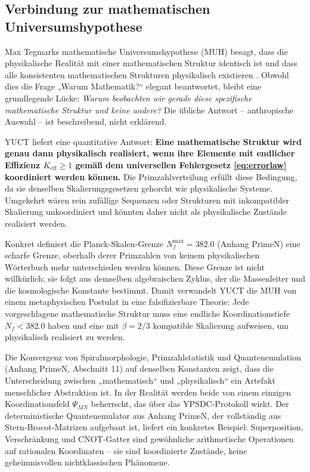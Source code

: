 \documentclass[12pt]{article}
\begin{document}
	\subsection{Verbindung zur mathematischen Universumshypothese}
	
	Max Tegmarks mathematische Universumshypothese (MUH) besagt, dass die physikalische Realität mit einer mathematischen Struktur identisch ist und dass alle konsistenten mathematischen Strukturen physikalisch existieren \cite{Tegmark2014}. Obwohl dies die Frage „Warum Mathematik?“ elegant beantwortet, bleibt eine grundlegende Lücke: \emph{Warum beobachten wir gerade diese spezifische mathematische Struktur und keine andere?} Die übliche Antwort – anthropische Auswahl – ist beschreibend, nicht erklärend.
	
	YUCT liefert eine quantitative Antwort: \textbf{Eine mathematische Struktur wird genau dann physikalisch realisiert, wenn ihre Elemente mit endlicher Effizienz \(K_{\mathrm{eff}} \ge 1\) gemäß dem universellen Fehlergesetz \eqref{eq:errorlaw} koordiniert werden können.} Die Primzahlverteilung erfüllt diese Bedingung, da sie denselben Skalierungsgesetzen gehorcht wie physikalische Systeme. Umgekehrt wären rein zufällige Sequenzen oder Strukturen mit inkompatibler Skalierung unkoordiniert und könnten daher nicht als physikalische Zustände realisiert werden.
	
	Konkret definiert die Planck‑Skalen‑Grenze \(N_f^{\max} = 382.0\) (Anhang PrimeN) eine scharfe Grenze, oberhalb derer Primzahlen von keinem physikalischen Wörterbuch mehr unterschieden werden können. Diese Grenze ist nicht willkürlich; sie folgt aus demselben algebraischen Zyklus, der die Massenleiter und die kosmologische Konstante bestimmt. Damit verwandelt YUCT die MUH von einem metaphysischen Postulat in eine falsifizierbare Theorie: Jede vorgeschlagene mathematische Struktur muss eine endliche Koordinationstiefe \(N_f < 382.0\) haben und eine mit \(\beta = 2/3\) kompatible Skalierung aufweisen, um physikalisch realisiert zu werden.
	
	Die Konvergenz von Spiralmorphologie, Primzahlstatistik und Quantenemulation (Anhang PrimeN, Abschnitt 11) auf denselben Konstanten zeigt, dass die Unterscheidung zwischen „mathematisch“ und „physikalisch“ ein Artefakt menschlicher Abstraktion ist. In der Realität werden beide von einem einzigen Koordinationsfeld \(\Psi_{MN}\) beherrscht, das über das YPSDC-Protokoll wirkt. Der deterministische Quantenemulator aus Anhang PrimeN, der vollständig aus Stern‑Brocot‑Matrizen aufgebaut ist, liefert ein konkretes Beispiel: Superposition, Verschränkung und CNOT‑Gatter sind gewöhnliche arithmetische Operationen auf rationalen Koordinaten – sie sind koordinierte Zustände, keine geheimnisvollen nichtklassischen Phänomene.
	
\end{document}
